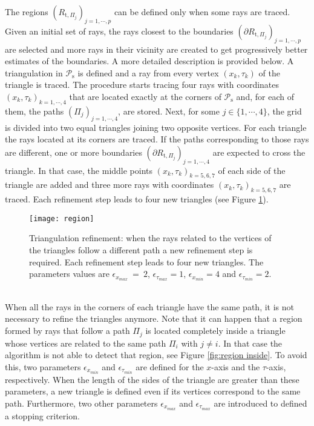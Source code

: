 The regions $(R_{\textrm{t}, \Pi_j})_{j =1, \cdots, p}$ can be defined only when some rays are traced.
Given an initial set of rays, the rays closest to the boundaries $(\partial R_{\textrm{t}, \Pi_j})_{j = 1, \cdots, p}$ are selected and more rays in their vicinity are created to get progressively better estimates of the boundaries. A more detailed description is provided below.
A triangulation in $\mathcal{P}_\textrm{s}$ is defined and a ray from every vertex $(x_k, \tau_k)$ of the triangle is traced.
The procedure starts tracing four rays with coordinates $(x_k,\tau_k)_{k=1, \cdots, 4}$ that are located exactly at the corners of $\mathcal{P}_\textrm{s}$ and, for each of them, the paths $(\Pi_{j})_{j = 1, \cdots, 4}$, are stored. Next, for some $j \in\{1, \cdots, 4\}$, the grid is divided into two equal triangles joining two opposite vertices. For each triangle the rays located at its corners are traced. If the paths corresponding to
those rays are different, one or more boundaries
$(\partial R_{\textrm{t}, \Pi_j})_{j =1, \cdots, 4}$ are expected to cross the triangle.
In that case, the middle points $(x_k, \tau_k)_{k = 5, 6, 7}$ of each side of the triangle are added and
three more rays with coordinates $(x_k, \tau_k)_{k = 5, 6,7}$ are traced. Each refinement step leads to four new triangles (see Figure \ref{fig:refinement}).
 \begin{figure}[h]
  \begin{center}
  \texttt{[image: region]}
  \end{center}
  \caption{Triangulation refinement:
  when the rays related to the vertices of the triangles follow a different path a new refinement step is required.
   Each refinement step leads to four new triangles.
   The parameters values are $\epsilon_{x_{max}}~=~ 2$, $\epsilon_{\tau_{max}}= 1$, $\epsilon_{x_{min}}= 4$ and $\epsilon_{\tau_{min}}=2$.}
  \label{fig:refinement}
\end{figure}
  \\
 \indent
When all the rays in the corners of each triangle have the same path, it is not necessary to refine the triangles anymore.
\noindent Note that it can happen that a region formed by rays that follow a path $\Pi_j$ is located completely inside a triangle whose vertices are related to the same path $\Pi_i$ with $j \neq i$. In that case the algorithm is not able to detect that region, see Figure \ref{fig:region inside}. To avoid this, two parameters $\epsilon_{x_{min}}$ and $\epsilon_{\tau_{min}}$ are defined for the $x$-axis and the $\tau$-axis, respectively. When the length of the sides of the triangle are greater than these parameters, a new triangle is defined even if its vertices correspond to the same path. Furthermore, two other parameters $\epsilon_{x_{max}}$ and $\epsilon_{\tau_{max}}$ are introduced to defined a stopping criterion.
